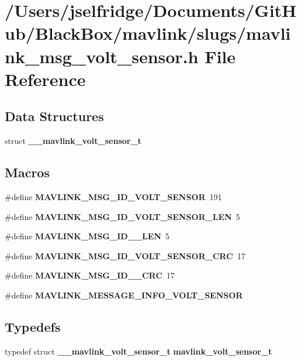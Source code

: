 \section{/\+Users/jselfridge/\+Documents/\+Git\+Hub/\+Black\+Box/mavlink/slugs/mavlink\+\_\+msg\+\_\+volt\+\_\+sensor.h File Reference}
\label{mavlink__msg__volt__sensor_8h}
\subsection*{Data Structures}
\begin{DoxyCompactItemize}
\item 
struct \textbf{ \+\_\+\+\_\+mavlink\+\_\+volt\+\_\+sensor\+\_\+t}
\end{DoxyCompactItemize}
\subsection*{Macros}
\begin{DoxyCompactItemize}
\item 
\#define \textbf{ M\+A\+V\+L\+I\+N\+K\+\_\+\+M\+S\+G\+\_\+\+I\+D\+\_\+\+V\+O\+L\+T\+\_\+\+S\+E\+N\+S\+OR}~191
\item 
\#define \textbf{ M\+A\+V\+L\+I\+N\+K\+\_\+\+M\+S\+G\+\_\+\+I\+D\+\_\+\+V\+O\+L\+T\+\_\+\+S\+E\+N\+S\+O\+R\+\_\+\+L\+EN}~5
\item 
\#define \textbf{ M\+A\+V\+L\+I\+N\+K\+\_\+\+M\+S\+G\+\_\+\+I\+D\+\_\+\_\+\+L\+EN}~5
\item 
\#define \textbf{ M\+A\+V\+L\+I\+N\+K\+\_\+\+M\+S\+G\+\_\+\+I\+D\+\_\+\+V\+O\+L\+T\+\_\+\+S\+E\+N\+S\+O\+R\+\_\+\+C\+RC}~17
\item 
\#define \textbf{ M\+A\+V\+L\+I\+N\+K\+\_\+\+M\+S\+G\+\_\+\+I\+D\+\_\+\_\+\+C\+RC}~17
\item 
\#define \textbf{ M\+A\+V\+L\+I\+N\+K\+\_\+\+M\+E\+S\+S\+A\+G\+E\+\_\+\+I\+N\+F\+O\+\_\+\+V\+O\+L\+T\+\_\+\+S\+E\+N\+S\+OR}
\end{DoxyCompactItemize}
\subsection*{Typedefs}
\begin{DoxyCompactItemize}
\item 
typedef struct \textbf{ \+\_\+\+\_\+mavlink\+\_\+volt\+\_\+sensor\+\_\+t} \textbf{ mavlink\+\_\+volt\+\_\+sensor\+\_\+t}
\end{DoxyCompactItemize}


